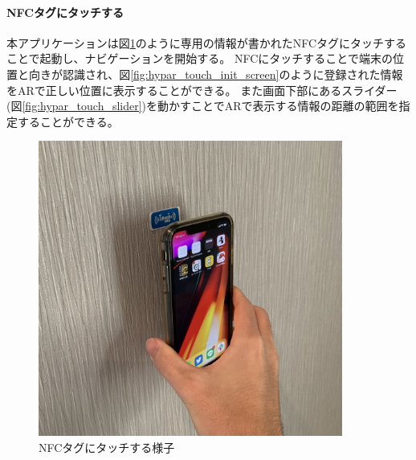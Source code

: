 \paragraph*{NFCタグにタッチする}
本アプリケーションは図\ref{fig:touch_nfc}のように専用の情報が書かれたNFCタグにタッチすることで起動し、ナビゲーションを開始する。
NFCにタッチすることで端末の位置と向きが認識され、図\ref{fig:hypar_touch_init_screen}のように登録された情報をARで正しい位置に表示することができる。
また画面下部にあるスライダー(図\ref{fig:hypar_touch_slider})を動かすことでARで表示する情報の距離の範囲を指定することができる。

\begin{figure}[h]
  \centering
  \includegraphics[width=100mm]{images/touch_nfc.jpg}
  \caption{NFCタグにタッチする様子} \label{fig:touch_nfc}
\end{figure}

